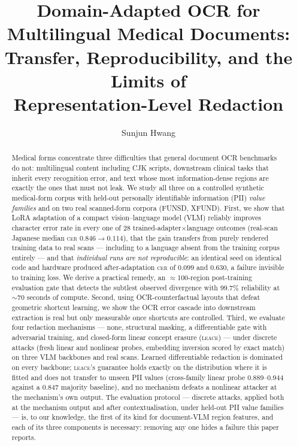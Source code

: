 \documentclass[11pt]{article}
\title{Domain-Adapted OCR for Multilingual Medical Documents:\\
Transfer, Reproducibility, and the Limits of\\ Representation-Level Redaction}
\author{Sunjun Hwang}
\date{}
\newcommand{\cer}{\textsc{cer}}
\newcommand{\leace}{\textsc{leace}}
\begin{document}
\maketitle

\begin{abstract}
Medical forms concentrate three difficulties that general document OCR
benchmarks do not: multilingual content including CJK scripts, downstream
clinical tasks that inherit every recognition error, and text whose most
information-dense regions are exactly the ones that must not leak. We study
all three on a controlled synthetic medical-form corpus with held-out
personally identifiable information (PII) \emph{value families} and on two
real scanned-form corpora (FUNSD, XFUND). First, we show that LoRA
adaptation of a compact vision--language model (VLM) reliably improves
character error rate in every one of 28 trained-adapter$\times$language
outcomes (real-scan Japanese median \cer{} $0.846\!\to\!0.114$), that the
gain transfers from purely rendered training data to real scans --- including
to a language absent from the training corpus entirely --- and that
\emph{individual runs are not reproducible}: an identical seed on identical
code and hardware produced after-adaptation \cer{} of $0.099$ and $0.630$,
a failure invisible to training loss. We derive a practical remedy, an
$\approx$100-region post-training evaluation gate that detects the subtlest
observed divergence with $99.7\%$ reliability at $\sim$70 seconds of compute.
Second, using OCR-counterfactual layouts that defeat geometric shortcut
learning, we show the OCR error cascade into downstream extraction is real
but only measurable once shortcuts are controlled. Third, we evaluate four
redaction mechanisms --- none, structural masking, a differentiable
gate with adversarial training, and closed-form linear concept erasure
(\leace{}) --- under discrete attacks (fresh linear and nonlinear probes,
embedding inversion scored by exact match) on three VLM backbones and real
scans. Learned differentiable redaction is dominated on every backbone;
\leace{}'s guarantee holds exactly on the distribution where it is fitted
and does not transfer to unseen PII values (cross-family linear probe
$0.889$--$0.944$ against a $0.847$ majority baseline), and no mechanism
defeats a nonlinear attacker at the mechanism's own output. The evaluation
protocol --- discrete attacks, applied both at the mechanism output and after
contextualisation, under held-out PII value families --- is, to our
knowledge, the first of its kind for document-VLM region features, and each
of its three components is necessary: removing any one hides a failure this
paper reports.
\end{abstract}
\end{document}
